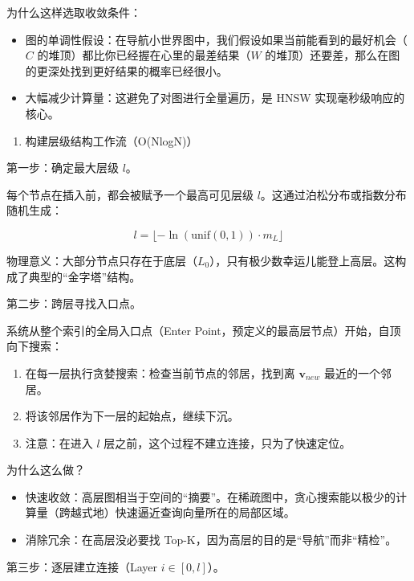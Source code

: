 为什么这样选取收敛条件：

\begin{itemize}
\tightlist
\item
  图的单调性假设：在导航小世界图中，我们假设如果当前能看到的最好机会（\(C\) 的堆顶）都比你已经握在心里的最差结果（\(W\) 的堆顶）还要差，那么在图的更深处找到更好结果的概率已经很小。
\item
  大幅减少计算量：这避免了对图进行全量遍历，是 HNSW 实现毫秒级响应的核心。
\end{itemize}

\begin{enumerate}
\def\labelenumi{\arabic{enumi}.}
\setcounter{enumi}{2}
\tightlist
\item
  构建层级结构工作流（O(NlogN)）
\end{enumerate}

第一步：确定最大层级 \(l\)。

每个节点在插入前，都会被赋予一个最高可见层级 \(l\)。这通过泊松分布或指数分布随机生成：

\[
l=\lfloor-\ln(\mathrm{unif}(0,1))\cdot m_L\rfloor
\]

物理意义：大部分节点只存在于底层（\(L_0\)），只有极少数幸运儿能登上高层。这构成了典型的``金字塔''结构。

第二步：跨层寻找入口点。

系统从整个索引的全局入口点（Enter Point，预定义的最高层节点）开始，自顶向下搜索：

\begin{enumerate}
\def\labelenumi{\arabic{enumi}.}
\item
  在每一层执行贪婪搜索：检查当前节点的邻居，找到离 \(\mathbf{v}_{new}\) 最近的一个邻居。
\item
  将该邻居作为下一层的起始点，继续下沉。
\item
  注意：在进入 \(l\) 层之前，这个过程不建立连接，只为了快速定位。
\end{enumerate}

为什么这么做？

\begin{itemize}
\tightlist
\item
  快速收敛：高层图相当于空间的``摘要''。在稀疏图中，贪心搜索能以极少的计算量（跨越式地）快速逼近查询向量所在的局部区域。
\item
  消除冗余：在高层没必要找 Top-K，因为高层的目的是``导航''而非``精检''。
\end{itemize}

第三步：逐层建立连接（Layer \(i\in[0,l]\)）。

